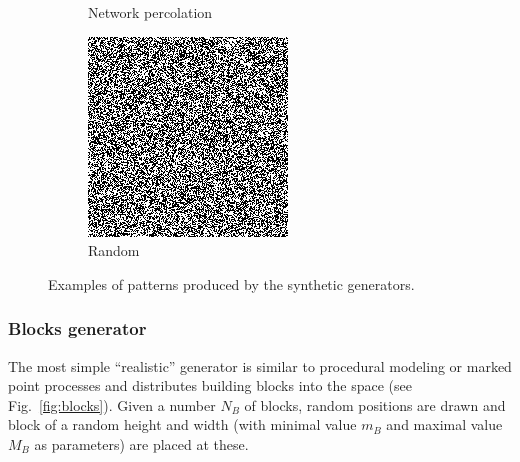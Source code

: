 \documentclass[letterpaper]{article}
\begin{document}
\begin{figure}
\begin{subfigure}[b]{0.2\textwidth}
        \caption{Network percolation}
        \label{fig:percolation}
    \end{subfigure}
    \begin{subfigure}[b]{0.2\textwidth}
        \includegraphics[width=\textwidth]{random}
        \caption{Random}
        \label{fig:random}
    \end{subfigure}
    \caption{Examples of patterns produced by the synthetic generators.}
    \label{fig:generators}
\end{figure}



\subsubsection{Blocks generator}

The most simple ``realistic'' generator is similar to procedural modeling or marked point processes and distributes building blocks into the space (see Fig.~\ref{fig:blocks}). Given a number $N_B$ of blocks, random positions are drawn and block of a random height and width (with minimal value $m_B$ and maximal value $M_B$ as parameters) are placed at these.
\end{document}
